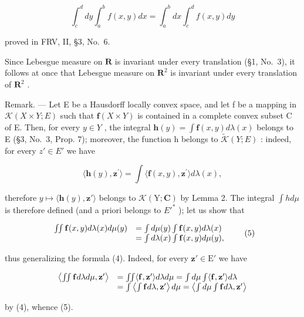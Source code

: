 \[
\int_ {c} ^ {d} d y \int_ {a} ^ {b} f (x, y) d x = \int_ {a} ^ {b} d x \int_ {c} ^ {d} f (x, y) d y
\]

proved in FRV, II, §3, No.~6.

Since Lebesgue measure on \(\mathbf{R}\) is invariant under every translation (§1, No.~3), it follows at once that Lebesgue measure on \(\mathbf{R}^2\) is invariant under every translation of \(\mathbf{R}^2\) .

Remark. --- Let E be a Hausdorff locally convex space, and let f be a mapping in \(\mathcal{K}(X \times Y; E)\) such that \(\mathbf{f}(X \times Y)\) is contained in a complete convex subset C of E. Then, for every \(y \in Y\) , the integral \(\mathbf{h}(y) = \int \mathbf{f}(x, y) d\lambda(x)\) belongs to E (§3, No.~3, Prop. 7); moreover, the function h belongs to \(\widetilde{\mathcal{K}}(Y; E)\) : indeed, for every \(z' \in E'\) we have

\[
\langle \mathbf {h} (y), \mathbf {z} ^ {\prime} \rangle = \int \langle \mathbf {f} (x, y), \mathbf {z} ^ {\prime} \rangle d \lambda (x),
\]

therefore \(y \mapsto \langle \mathbf{h}(y), \mathbf{z}' \rangle\) belongs to \(\mathcal{K}(\mathrm{Y}; \mathbf{C})\) by Lemma 2. The integral \(\int h d\mu\) is therefore defined (and a priori belongs to \(E'^{*}\) ); let us show that

\[
\begin{array}{r l} \iint \mathbf {f} (x, y) d \lambda (x) d \mu (y) & = \int d \mu (y) \int \mathbf {f} (x, y) d \lambda (x) \\ & = \int d \lambda (x) \int \mathbf {f} (x, y) d \mu (y), \end{array}\tag{5}
\]

thus generalizing the formula (4). Indeed, for every \(\mathbf{z}' \in \mathrm{E}'\) we have

\[
\begin{array}{r l} \left\langle \iint \mathbf {f} d \lambda d \mu , \mathbf {z} ^ {\prime} \right\rangle & = \iint \langle \mathbf {f}, \mathbf {z} ^ {\prime} \rangle d \lambda d \mu = \int d \mu \int \langle \mathbf {f}, \mathbf {z} ^ {\prime} \rangle d \lambda \\ & = \int \left\langle \int \mathbf {f} d \lambda , \mathbf {z} ^ {\prime} \right\rangle d \mu = \left\langle \int d \mu \int \mathbf {f} d \lambda , \mathbf {z} ^ {\prime} \right\rangle \end{array}
\]

by (4), whence (5).

